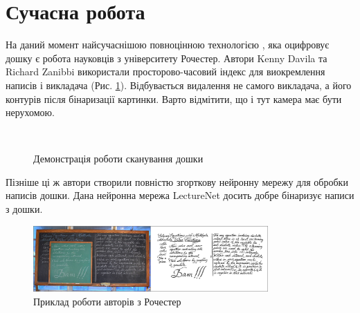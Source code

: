 \section{Сучасна робота}
На даний момент найсучаснішою повноцінною технологією \cite{davila:2017}, яка оцифровує дошку є робота
науковців з університету Рочестер. Автори Kenny Davila та Richard Zanibbi
використали просторово-часовий індекс для виокремлення написів і викладача (Рис. \ref{fig:davila:2017}).
Відбувається видалення не самого викладача,  а його контурів після бінаризації картинки.
Варто відмітити, що і тут камера має бути нерухомою.
\begin{figure}[H]
  \centering
  \\
  \caption{Демонстрація роботи сканування дошки \cite{davila:2017}
    \label{fig:davila:2017}
  }
\end{figure}
Пізніше ці ж автори створили повністю згорткову нейронну мережу \cite{davila:2021}
для обробки написів дошки. Дана нейронна мережа LectureNet досить добре бінаризує написи з дошки.
\begin{figure}[H]
  \centering
  \includegraphics[width=0.8\textwidth]{images/davila_2021}
  \caption{Приклад роботи авторів з Рочестер}
  \label{fig:davila:2021}
\end{figure}

\clearpage